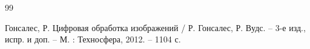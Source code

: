 \begin{thebibliography}{99}
    \setlength{\itemindent}{1.95cm} %
    \setlength{\leftmargin}{1.25cm} %
    \setlength{\labelsep}{2mm} %

    \raggedright%
    \justifying
    
     Гонсалес, Р. Цифровая обработка изображений / Р. Гонсалес, Р. Вудс. – 3-е изд., испр. и доп. – М. : Техносфера, 2012. – 1104 с.
    
    

    
    


\end{thebibliography}